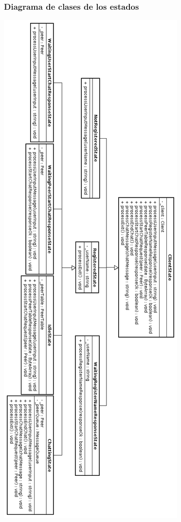 \subsubsection{Diagrama de clases de los estados}
\begin{center}
\small\includegraphics[scale=0.45]{./Images/DiagramaDeClasesDeLosEstados2}
\end{center}

